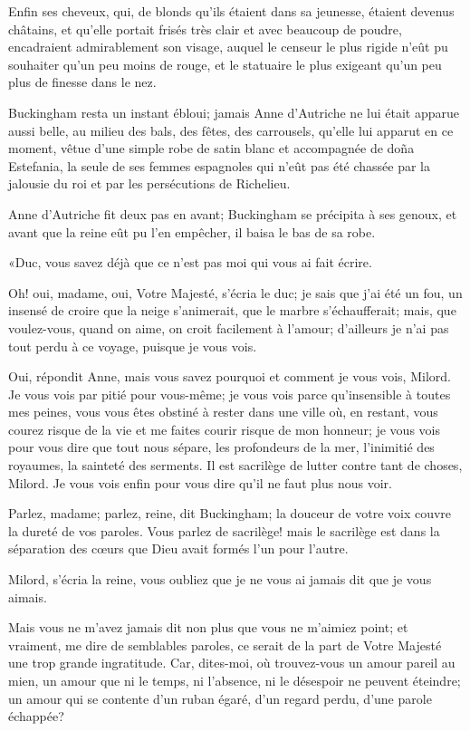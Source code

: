 Enfin ses cheveux, qui, de blonds qu'ils étaient dans sa jeunesse, étaient devenus châtains, et qu'elle portait frisés très clair et avec beaucoup de poudre, encadraient admirablement son visage, auquel le censeur le plus rigide n'eût pu souhaiter qu'un peu moins de rouge, et le statuaire le plus exigeant qu'un peu plus de finesse dans le nez. 

Buckingham resta un instant ébloui; jamais Anne d'Autriche ne lui était apparue aussi belle, au milieu des bals, des fêtes, des carrousels, qu'elle lui apparut en ce moment, vêtue d'une simple robe de satin blanc et accompagnée de doña Estefania, la seule de ses femmes espagnoles qui n'eût pas été chassée par la jalousie du roi et par les persécutions de Richelieu. 

Anne d'Autriche fit deux pas en avant; Buckingham se précipita à ses genoux, et avant que la reine eût pu l'en empêcher, il baisa le bas de sa robe. 

«Duc, vous savez déjà que ce n'est pas moi qui vous ai fait écrire. 

\speak  Oh! oui, madame, oui, Votre Majesté, s'écria le duc; je sais que j'ai été un fou, un insensé de croire que la neige s'animerait, que le marbre s'échaufferait; mais, que voulez-vous, quand on aime, on croit facilement à l'amour; d'ailleurs je n'ai pas tout perdu à ce voyage, puisque je vous vois. 

\speak  Oui, répondit Anne, mais vous savez pourquoi et comment je vous vois, Milord. Je vous vois par pitié pour vous-même; je vous vois parce qu'insensible à toutes mes peines, vous vous êtes obstiné à rester dans une ville où, en restant, vous courez risque de la vie et me faites courir risque de mon honneur; je vous vois pour vous dire que tout nous sépare, les profondeurs de la mer, l'inimitié des royaumes, la sainteté des serments. Il est sacrilège de lutter contre tant de choses, Milord. Je vous vois enfin pour vous dire qu'il ne faut plus nous voir. 

\speak  Parlez, madame; parlez, reine, dit Buckingham; la douceur de votre voix couvre la dureté de vos paroles. Vous parlez de sacrilège! mais le sacrilège est dans la séparation des cœurs que Dieu avait formés l'un pour l'autre. 

\speak  Milord, s'écria la reine, vous oubliez que je ne vous ai jamais dit que je vous aimais. 

\speak  Mais vous ne m'avez jamais dit non plus que vous ne m'aimiez point; et vraiment, me dire de semblables paroles, ce serait de la part de Votre Majesté une trop grande ingratitude. Car, dites-moi, où trouvez-vous un amour pareil au mien, un amour que ni le temps, ni l'absence, ni le désespoir ne peuvent éteindre; un amour qui se contente d'un ruban égaré, d'un regard perdu, d'une parole échappée? 

